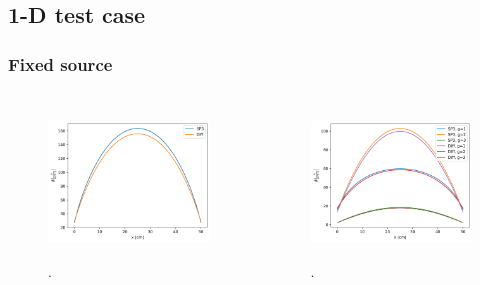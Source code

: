 \subsection{1-D test case}
\begin{frame}
\frametitle{Fixed source}
\begin{columns}
    \column[t]{5cm}
	\begin{figure}[htbp!]
		\begin{center}
			\includegraphics[height=4cm]{../output-1g-fixed}
		\end{center}
		\caption{.}
	\end{figure}

	\column[t]{5cm}
	\begin{figure}[htbp!]
		\begin{center}
			\includegraphics[height=4cm]{../output-3g-fixed}
		\end{center}
		\caption{.}
	\end{figure}
\end{columns}
\end{frame}


